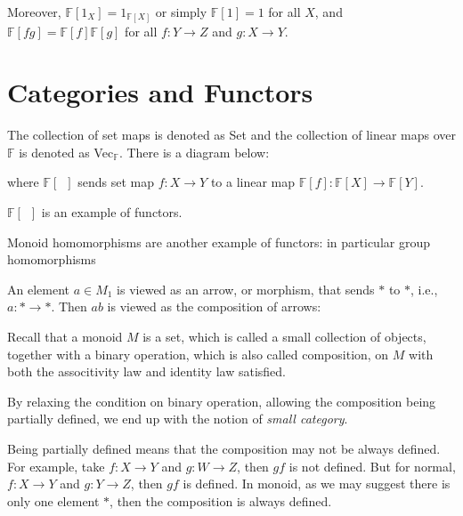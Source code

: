 \documentclass[
	11pt, %
	fleqn, %
	a4paper, %
]{LegrandOrangeBook}
\newcommand{\F}{\mathbb{F}} %
\begin{document}
Moreover, $\F[1_X] = 1_{\F[X]}$ or simply $\F[1] = 1$ for all $X$, and $\F[fg] = \F[f] \F[g]$ for all $f : Y \to Z$ and $g : X \to Y$.

\newpage

\section{Categories and Functors}

The collection of set maps is denoted as Set and the collection of linear maps over $\F$ is denoted as Vec$_{\F}$. There is a diagram below:
\begin{center}
\end{center}
where $\F[\phantom{f}]$ sends set map $f : X \to Y$ to a linear map $\F[f] : \F[X] \to \F[Y]$. 

$\F[\phantom{f}]$ is an example of functors.

Monoid homomorphisms are another example of functors: in particular group homomorphisms
\begin{center}
\end{center}

An element $a \in M_1$ is viewed as an arrow, or morphism, that sends $*$ to $*$, i.e., $a : * \to *$. Then $ab$ is viewed as the composition of arrows:
\begin{center}
\end{center}

Recall that a monoid $M$ is a set, which is called a small collection of objects, together with a binary operation, which is also called composition, on $M$ with both the associtivity law and identity law satisfied. 

By relaxing the condition on binary operation, allowing the composition being partially defined, we end up with the notion of \emph{small category}.

Being partially defined means that the composition may not be always defined. For example, take $f : X \to Y$ and $g : W \to Z$, then $gf$ is not defined. But for normal, $f : X \to Y$ and $g : Y \to Z$, then $gf$ is defined. In monoid, as we may suggest there is only one element $*$, then the composition is always defined.
\end{document}

